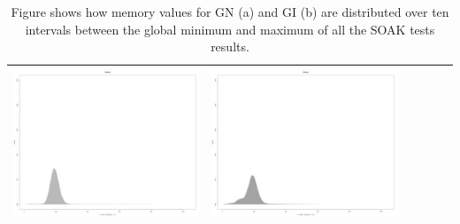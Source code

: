 \begin{table}[htbp]
{\begin{tabular}{l | ccccc}
\begin{minipage}{.15\textwidth}
     			 	\includegraphics[width=\linewidth]{images/mema-dens-graph/I14}
    				 \end{minipage}
    			   &	 \begin{minipage}{.15\textwidth}
     			 	\includegraphics[width=\linewidth]{images/mema-dens-graph/I15}
    				 \end{minipage}\\
		\hline %
	 \end{tabular}
	}
	\caption[\textsc{Analyser} Investigation Stack - Level 2 - Pattern Identification - Memory Distribution - Baselines GN and GI]{Figure shows how memory values for GN (a) and GI (b) are distributed over ten intervals between the global  minimum and maximum of all the SOAK tests results.} 
	\label{tab:level2-memory-density-graph}
	\end{table}